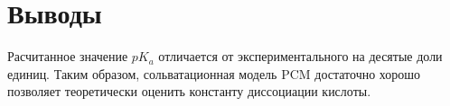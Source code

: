 \section{Выводы}
Расчитанное значение $pK_a$ отличается от экспериментального на десятые доли единиц. Таким образом, сольватационная модель PCM достаточно хорошо позволяет теоретически оценить константу диссоциации кислоты. 